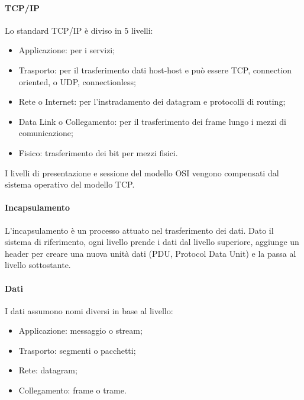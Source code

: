 \documentclass{subfiles}
\begin{document}
    \paragraph{TCP/IP}
    Lo standard TCP/IP è diviso in 5 livelli:
    \begin{itemize}
        \item Applicazione: per i servizi;
        \item Trasporto: per il trasferimento dati host-host e può essere TCP, connection oriented, o UDP, connectionless;
        \item Rete o Internet: per l'instradamento dei datagram e protocolli di routing;
        \item Data Link o Collegamento: per il trasferimento dei frame lungo i mezzi di comunicazione;
        \item Fisico: trasferimento dei bit per mezzi fisici.
    \end{itemize}
    
    \begin{Note*}
        I livelli di presentazione e sessione del modello OSI vengono compensati dal sistema operativo del modello TCP.
    \end{Note*}
    
    \paragraph{Incapsulamento}
    L'incapsulamento è un processo attuato nel trasferimento dei dati. Dato il sistema di riferimento, ogni livello prende i dati dal 
    livello superiore, aggiunge un header per creare una nuova unità dati (PDU, Protocol Data Unit) e la passa al livello sottostante.
    
    \paragraph{Dati}
    I dati assumono nomi diversi in base al livello:
    \begin{itemize}
        \item Applicazione: messaggio o stream;
        \item Trasporto: segmenti o pacchetti;
        \item Rete: datagram;
        \item Collegamento: frame o trame.
    \end{itemize}
\end{document}
